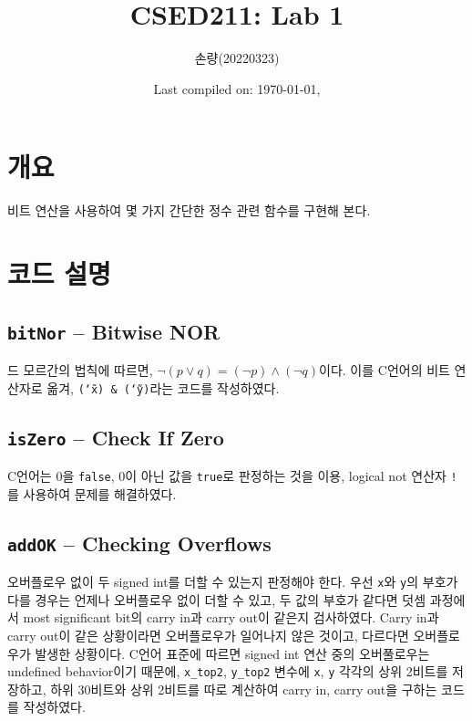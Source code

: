 \documentclass{scrartcl}
\title{CSED211: Lab 1}
\author{손량(20220323)}
\date{Last compiled on: \today, \currenttime}
\begin{document}
\maketitle

\section{개요}
비트 연산을 사용하여 몇 가지 간단한 정수 관련 함수를 구현해 본다.

\section{코드 설명}

\subsection{\texttt{bitNor} -- Bitwise NOR}
드 모르간의 법칙에 따르면, \(\neg (p \lor q) = (\neg p) \land (\neg q)\)이다.
이를 C언어의 비트 연산자로 옮겨, \texttt{(\char`\~x) \& (\char`\~y)}라는 코드를
작성하였다.

\subsection{\texttt{isZero} -- Check If Zero}
C언어는 0을 \texttt{false}, 0이 아닌 값을 \texttt{true}로 판정하는 것을 이용,
logical not 연산자 \texttt{!}를 사용하여 문제를 해결하였다.

\subsection{\texttt{addOK} -- Checking Overflows}
오버플로우 없이 두 signed int를 더할 수 있는지 판정해야 한다. 우선 \texttt{x}와
\texttt{y}의 부호가 다를 경우는 언제나 오버플로우 없이 더할 수 있고, 두 값의
부호가 같다면 덧셈 과정에서 most significant bit의 carry in과 carry out이
같은지 검사하였다. Carry in과 carry out이 같은 상황이라면 오버플로우가 일어나지
않은 것이고, 다르다면 오버플로우가 발생한 상황이다. C언어 표준에 따르면 signed
int 연산 중의 오버풀로우는 undefined behavior이기 때문에, \texttt{x\_top2},
\texttt{y\_top2} 변수에 \texttt{x}, \texttt{y} 각각의 상위 2비트를 저장하고,
하위 30비트와 상위 2비트를 따로 계산하여 carry in, carry out을 구하는 코드를
작성하였다.
\end{document}
